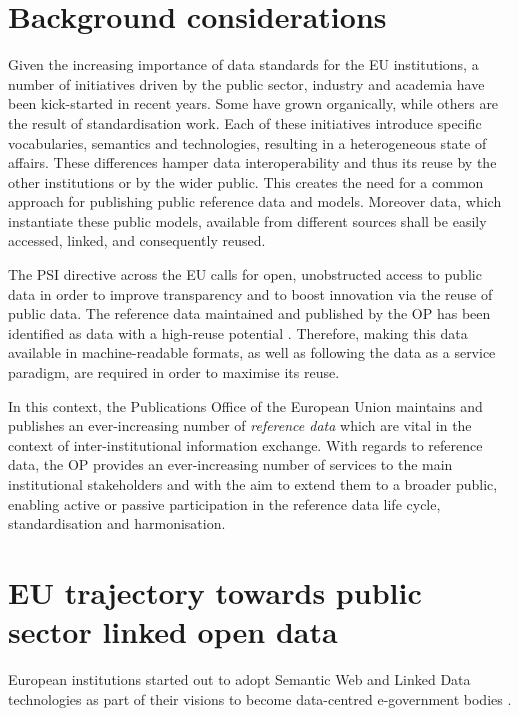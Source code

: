 	
	\section{Background considerations}
	
	Given the increasing importance of data standards for the EU institutions, a number of initiatives driven by the public sector, industry and academia have been kick-started in recent years. Some have grown organically, while others are the result of standardisation work. Each of these initiatives introduce specific vocabularies, semantics and technologies, resulting in a heterogeneous state of affairs. These differences hamper data interoperability and thus its reuse by the other institutions or by the wider public. This creates the need for a common approach for publishing public reference data and models. Moreover data, which instantiate these public models, available from different sources shall be easily accessed, linked, and consequently reused.
	
	The PSI directive \cite{directive-2019/1024} across the EU calls for open, unobstructed access to public data in order to improve transparency and to boost innovation via the reuse of public data. The reference data maintained and published by the OP has been identified as data with a high-reuse potential \cite{d-high-value-assets}. Therefore, making this data available in machine-readable formats, as well as following the data as a service paradigm, are required in order to maximise its reuse.
	
	In this context, the Publications Office of the European Union maintains and publishes an ever-increasing number of \textit{reference data} which are vital in the context of inter-institutional information exchange. With regards to reference data, the OP provides an ever-increasing number of services to the main institutional stakeholders and with the aim to extend them to a broader public, enabling active or passive participation in the reference data life cycle, standardisation and harmonisation.

	\section{EU trajectory towards public sector linked open data}
	
	European institutions started out to adopt Semantic Web and Linked Data technologies as part of their visions to become data-centred e-government bodies \citep{decission-456/2005/EC,decission-2015/2240}. 
	
